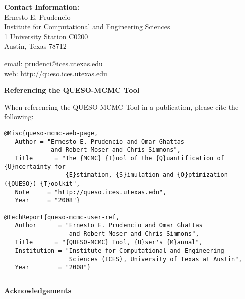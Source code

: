 {\bf Contact Information:}\\
Ernesto E. Prudencio\\
Institute for Computational and Engineering Sciences\\
1 University Station C0200\\
Austin, Texas 78712

email: prudenci@ices.utexas.edu\\
web: http://queso.ices.utexas.edu\\
$~$\\

\centerline{\bf Referencing the QUESO-MCMC Tool}

When referencing the QUESO-MCMC Tool in a publication, please cite the following:
\begin{verbatim}
@Misc{queso-mcmc-web-page,
   Author = "Ernesto E. Prudencio and Omar Ghattas
             and Robert Moser and Chris Simmons",
   Title      = "The {MCMC} {T}ool of the {Q}uantification of {U}ncertainty for
                 {E}stimation, {S}imulation and {O}ptimization ({QUESO}) {T}oolkit",
   Note     = "http://queso.ices.utexas.edu",
   Year     = "2008"}

@TechReport{queso-mcmc-user-ref,
   Author      = "Ernesto E. Prudencio and Omar Ghattas
                  and Robert Moser and Chris Simmons",
   Title      = "{QUESO-MCMC} Tool, {U}ser's {M}anual",
   Institution = "Institute for Computational and Engineering
                  Sciences (ICES), University of Texas at Austin",
   Year        = "2008"}
\end{verbatim}
$~$\\
$~$\\

\centerline{\bf Acknowledgements}

